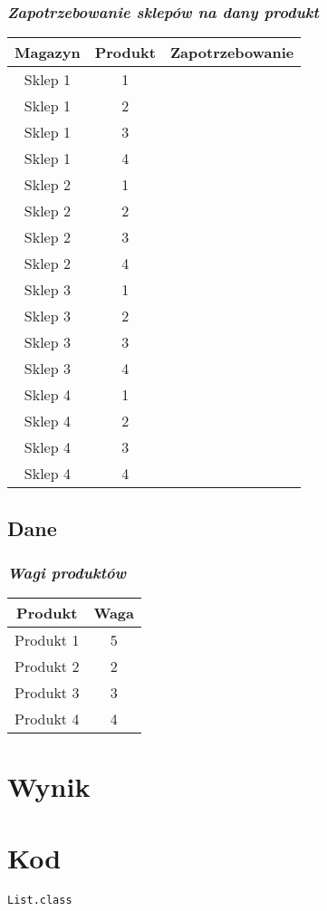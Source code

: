 \documentclass[a4paper]{article}
\begin{document}
\subsubsection{\textit{Zapotrzebowanie sklepów na dany produkt}}
\begin{center}
	\begin{tabular}{ |c|c|c | } 
		\hline
		Magazyn & Produkt & Zapotrzebowanie\\
		\hline
		Sklep 1 & 1 & \\ 
		\hline
		Sklep 1 & 2 & \\ 
		\hline
		Sklep 1 & 3 & \\ 
		\hline
		Sklep 1 & 4 & \\ 
		\hline
		Sklep 2 & 1 & \\ 
		\hline
		Sklep 2 & 2 & \\ 
		\hline
		Sklep 2 & 3 & \\ 
		\hline
		Sklep 2 & 4 & \\ 
		\hline
		Sklep 3 & 1 & \\ 
		\hline
		Sklep 3 & 2 & \\ 
		\hline
		Sklep 3 & 3 & \\ 
		\hline
		Sklep 3 & 4 & \\ 
		\hline
		Sklep 4 & 1 & \\ 
		\hline
		Sklep 4 & 2 & \\ 
		\hline
		Sklep 4 & 3 & \\ 
		\hline
		Sklep 4 & 4 & \\ 
		\hline
	\end{tabular}
\end{center}

\subsection{Dane}

\subsubsection{\textit{Wagi produktów}}
\begin{center}
	\begin{tabular}{ |c|c| } 
		\hline
		Produkt & Waga \\
		\hline
		Produkt 1 & 5  \\ 
		\hline
		Produkt 2 & 2  \\ 
		\hline
		Produkt 3 & 3  \\ 
		\hline
		Produkt 4 & 4  \\ 
		\hline
	\end{tabular}
\end{center}

\newpage


\section{Wynik}


\newpage 

\section{Kod}
\texttt{List.class}
\end{document}
